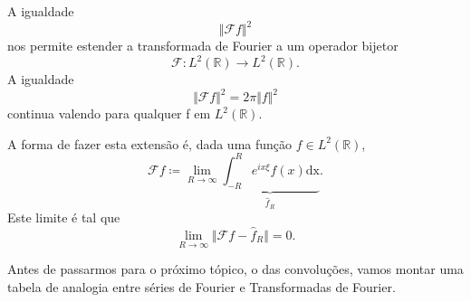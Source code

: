 \documentclass[../pde_notes.tex]{subfiles}
\begin{document}
\begin{tcolorbox}[
		skin=enhanced,
		title=Observação,
		fonttitle=\bfseries,
		colframe=black,
		colbacktitle=cyan!75!white,
		colback=cyan!15,
		colbacklower=black,
		coltitle=black,
		drop fuzzy shadow,
	]
	A igualdade
	\[
		\Vert \mathcal{F}f \Vert^{2}
	\]
	nos permite estender a transformada de Fourier a um operador bijetor
	\[
		\mathcal{F}:L^{2}(\mathbb{R})\rightarrow L^{2}(\mathbb{R}).
	\]
	A igualdade
	\[
		\Vert \mathcal{F}f \Vert^{2} = 2\pi \Vert f \Vert^{2}
	\]
	continua valendo para qualquer f em \(L^{2}(\mathbb{R})\).

	A forma de fazer esta extensão é, dada uma função \(f\in L^{2}(\mathbb{R})\),
	\[
		\mathcal{F}f \coloneqq \lim_{R\to \infty}\underbrace{\int_{-R}^{R}e^{ix\xi }f(x) \mathrm{dx}}_{\hat{f}_{R}}.
	\]
	Este limite é tal que
	\[
		\lim_{R\to \infty}\Vert \mathcal{F}f - \hat{f}_{R} \Vert = 0.
	\]
\end{tcolorbox}

Antes de passarmos para o próximo tópico, o das convoluções, vamos montar uma tabela de analogia entre séries de Fourier e Transformadas de Fourier.
\begin{table}[H]
	\centering
	\caption{Analogia entre Série e Transformada de Fourier}
\end{table}
\end{document}
